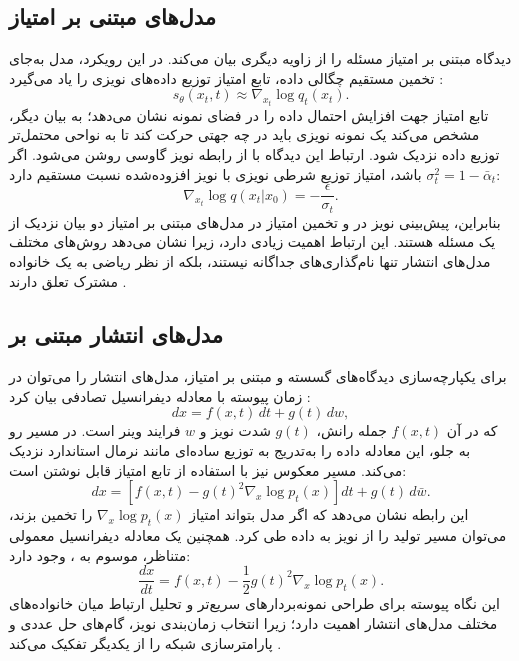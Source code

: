 \subsection{مدل‌های مبتنی بر امتیاز}
دیدگاه مبتنی بر امتیاز مسئله را از زاویه دیگری بیان می‌کند. در این رویکرد، مدل به‌جای تخمین مستقیم چگالی داده، تابع امتیاز توزیع داده‌های نویزی را یاد می‌گیرد \cite{song2019scoreGenerative,song2021scoreSDE}:
\begin{equation}
s_\theta(x_t,t) \approx \nabla_{x_t}\log q_t(x_t).
\end{equation}
تابع امتیاز جهت افزایش احتمال داده را در فضای نمونه نشان می‌دهد؛ به بیان دیگر، مشخص می‌کند یک نمونه نویزی باید در چه جهتی حرکت کند تا به نواحی محتمل‌تر توزیع داده نزدیک شود. ارتباط این دیدگاه با  از رابطه نویز گاوسی روشن می‌شود. اگر $\sigma_t^2 = 1-\bar{\alpha}_t$ باشد، امتیاز توزیع شرطی نویزی با نویز افزوده‌شده نسبت مستقیم دارد:
\begin{equation}
\nabla_{x_t}\log q(x_t|x_0) = -\frac{\epsilon}{\sigma_t}.
\end{equation}
بنابراین، پیش‌بینی نویز در  و تخمین امتیاز در مدل‌های مبتنی بر امتیاز دو بیان نزدیک از یک مسئله هستند. این ارتباط اهمیت زیادی دارد، زیرا نشان می‌دهد روش‌های مختلف مدل‌های انتشار تنها نام‌گذاری‌های جداگانه نیستند، بلکه از نظر ریاضی به یک خانواده مشترک تعلق دارند \cite{song2021scoreSDE,0214306}.

\subsection{مدل‌های انتشار مبتنی بر }
برای یکپارچه‌سازی دیدگاه‌های گسسته و مبتنی بر امتیاز، مدل‌های انتشار را می‌توان در زمان پیوسته با معادله دیفرانسیل تصادفی بیان کرد \cite{song2021scoreSDE}:
\begin{equation}
d x = f(x,t)\,dt + g(t)\,d w,
\end{equation}
که در آن $f(x,t)$ جمله رانش، $g(t)$ شدت نویز و $w$ فرایند وینر است. در مسیر رو به جلو، این معادله داده را به‌تدریج به توزیع ساده‌ای مانند نرمال استاندارد نزدیک می‌کند. مسیر معکوس نیز با استفاده از تابع امتیاز قابل نوشتن است:
\begin{equation}
d x =
\left[
f(x,t) - g(t)^2\nabla_x\log p_t(x)
\right]dt
+ g(t)\,d\bar{w}.
\end{equation}
این رابطه نشان می‌دهد که اگر مدل بتواند امتیاز $\nabla_x\log p_t(x)$ را تخمین بزند، می‌توان مسیر تولید را از نویز به داده طی کرد. همچنین یک معادله دیفرانسیل معمولی متناظر، موسوم به ، وجود دارد:
\begin{equation}
\frac{d x}{dt} =
f(x,t) - \frac{1}{2}g(t)^2\nabla_x\log p_t(x).
\end{equation}
این نگاه پیوسته برای طراحی نمونه‌بردارهای سریع‌تر و تحلیل ارتباط میان خانواده‌های مختلف مدل‌های انتشار اهمیت دارد؛ زیرا انتخاب زمان‌بندی نویز، گام‌های حل عددی و پارامترسازی شبکه را از یکدیگر تفکیک می‌کند \cite{song2021scoreSDE,karras2022edm}.

